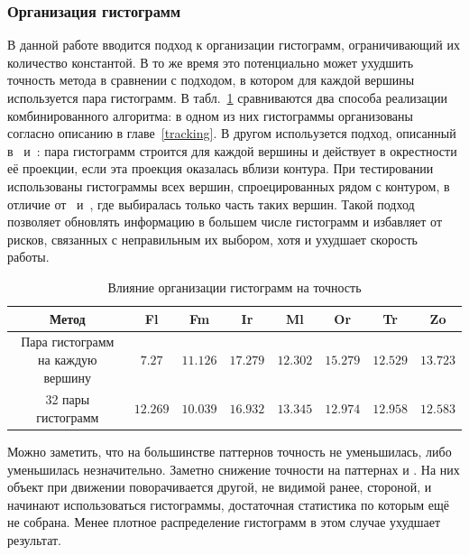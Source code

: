 \subsubsection{Организация гистограмм}

В данной работе вводится подход к организации гистограмм, ограничивающий их
количество константой.
В то же время это потенциально может ухудшить точность метода в сравнении с
подходом, в котором для каждой вершины используется пара гистограмм.
В табл.~\ref{tab:full_hist} сравниваются два способа реализации
комбинированного алгоритма: в одном из них гистограммы организованы согласно
описанию в главе~\ref{tracking}.
В другом испольузется подход, описанный в~\cite{Tjaden2017}
и~\cite{Tjaden2018}: пара гистограмм строится для каждой вершины и действует в
окрестности её проекции, если эта проекция оказалась вблизи контура.
При тестировании использованы гистограммы всех вершин, спроецированных рядом
с контуром, в отличие от~\cite{Tjaden2017} и~\cite{Tjaden2018}, где выбиралась
только часть таких вершин.
Такой подход позволяет обновлять информацию в большем числе гистограмм и
избавляет от рисков, связанных с неправильным их выбором, хотя и ухудшает
скорость работы.

\begin{table}[h]
\caption{\label{tab:full_hist}Влияние организации гистограмм на точность}
\begin{center}
\begin{tabular}{|c|c|c|c|c|c|c|c|}
\hline
Метод & Fl & Fm & Ir & Ml & Or & Tr & Zo \\
\hline
Пара гистограмм на каждую вершину & $7.27$ & $\mathbf{11.126}$ &
$\mathbf{17.279}$ & $12.302$ & $\mathbf{15.279}$ & $12.529$ &
$\mathbf{13.723}$\\
\hline
32 пары гистограмм & $\mathbf{12.269}$ & $10.039$ & $16.932$ &
$\mathbf{13.345}$ & $12.974$ &
$\mathbf{12.958}$ & $12.583$ \\
\hline
\end{tabular}
\end{center}
\end{table}

Можно заметить, что на большинстве паттернов  точность не уменьшилась, либо
уменьшилась незначительно.
Заметно снижение точности на паттернах  и .
На них объект при движении поворачивается другой, не видимой ранее, стороной, и
начинают использоваться гистограммы, достаточная статистика по которым ещё не
собрана.
Менее плотное распределение гистограмм в этом случае ухудшает результат.

